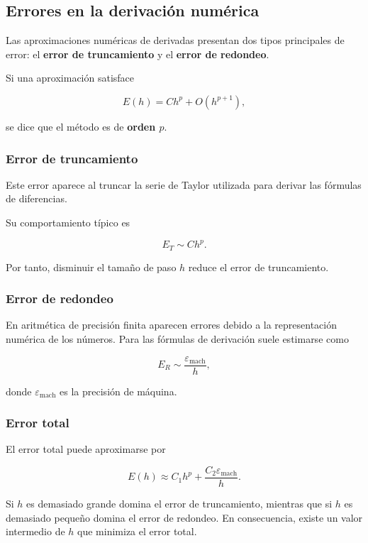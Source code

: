 \documentclass[12pt,a4paper]{article}
\theoremstyle{definition}
\theoremstyle{remark}
\begin{document}
\newpage
\subsection{Errores en la derivación numérica}

Las aproximaciones numéricas de derivadas presentan dos tipos principales de error:
el \textbf{error de truncamiento} y el \textbf{error de redondeo}.

Si una aproximación satisface

\[
E(h) = C h^p + O(h^{p+1}),
\]

se dice que el método es de \textbf{orden $p$}.

\subsubsection*{Error de truncamiento}

Este error aparece al truncar la serie de Taylor utilizada para derivar
las fórmulas de diferencias.

Su comportamiento típico es

\[
E_T \sim C h^p.
\]

Por tanto, disminuir el tamaño de paso $h$ reduce el error de truncamiento.

\subsubsection*{Error de redondeo}

En aritmética de precisión finita aparecen errores debido a la representación
numérica de los números. Para las fórmulas de derivación suele estimarse como

\[
E_R \sim \frac{\varepsilon_{\text{mach}}}{h},
\]

donde $\varepsilon_{\text{mach}}$ es la precisión de máquina.

\subsubsection*{Error total}

El error total puede aproximarse por

\[
E(h) \approx C_1 h^p + \frac{C_2 \varepsilon_{\text{mach}}}{h}.
\]

Si $h$ es demasiado grande domina el error de truncamiento, mientras que si
$h$ es demasiado pequeño domina el error de redondeo. En consecuencia, existe
un valor intermedio de $h$ que minimiza el error total.
\end{document}
